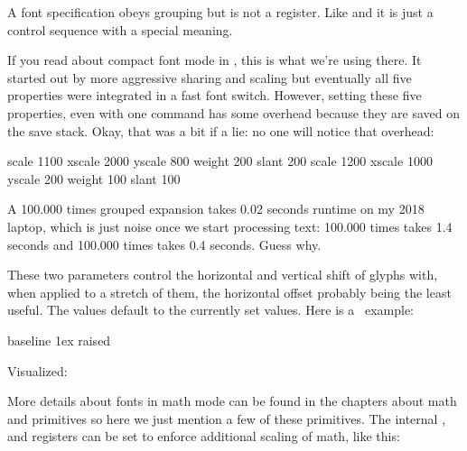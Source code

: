 A font specification obeys grouping but is not a register. Like \type
{\integerdef} and \type {\dimendef} it is just a control sequence with a special
meaning.

If you read about compact font mode in \CONTEXT, this is what we're using there.
It started out by more aggressive sharing and scaling but eventually all five
properties were integrated in a fast font switch. However, setting these five
properties, even with one command has some overhead because they are saved on the
save stack. Okay, that was a bit if a lie: no one will notice that overhead:

\startbuffer
\fontspecdef \MyFontA \font
    scale 1100 xscale 2000 yscale 800 weight 200 slant 200
\relax
\fontspecdef \MyFontB \font
    scale 1200 xscale 1000 yscale 200 weight 100 slant 100
\relax
\stopbuffer

\typebuffer [option=TEX]

A 100.000 times \type {{\MyFontA \MyFontB}} grouped expansion takes 0.02 seconds
runtime on my 2018 laptop, which is just noise once we start processing text:
100.000 times  takes 1.4 seconds
and 100.000 times  takes 0.4 seconds. Guess
why.

\stopsubsection

\startsubsection[title=Offsets]

These two parameters control the horizontal and vertical shift of glyphs with,
when applied to a stretch of them, the horizontal offset probably being the least
useful. The values default to the currently set values. Here is a \CONTEXT\ example:

\startbuffer
{} \bgroup
     \bgroup
        baseline
        \glyphyoffset 1ex  \glyphyscale \glyphxscale
        raised%
    \egroup
\egroup
\stopbuffer

\typebuffer

Visualized:

\startlinecorrection[blank]
\getbuffer
\stoplinecorrection

\stopsubsection

\startsubsection[title=Math scales and identifiers]

More details about fonts in math mode can be found in the chapters about math and
primitives so here we just mention a few of these primitives. The internal \type
{\glyphtextscale}, \type {\glyphscriptscale} and \type {\glyphscriptscriptscale}
registers can be set to enforce additional scaling of math, like this:

